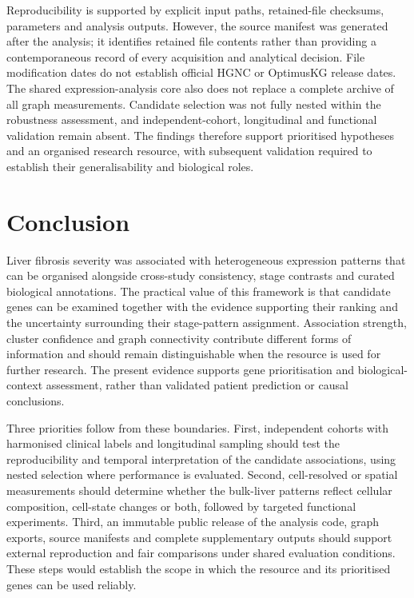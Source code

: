 \documentclass[11pt,a4paper]{article}
\begin{document}
Reproducibility is supported by explicit input paths, retained-file checksums, parameters and analysis outputs. However, the source manifest was generated after the analysis; it identifies retained file contents rather than providing a contemporaneous record of every acquisition and analytical decision. File modification dates do not establish official HGNC or OptimusKG release dates. The shared expression-analysis core also does not replace a complete archive of all graph measurements. Candidate selection was not fully nested within the robustness assessment, and independent-cohort, longitudinal and functional validation remain absent. The findings therefore support prioritised hypotheses and an organised research resource, with subsequent validation required to establish their generalisability and biological roles.

\section*{Conclusion}
Liver fibrosis severity was associated with heterogeneous expression patterns that can be organised alongside cross-study consistency, stage contrasts and curated biological annotations. The practical value of this framework is that candidate genes can be examined together with the evidence supporting their ranking and the uncertainty surrounding their stage-pattern assignment. Association strength, cluster confidence and graph connectivity contribute different forms of information and should remain distinguishable when the resource is used for further research. The present evidence supports gene prioritisation and biological-context assessment, rather than validated patient prediction or causal conclusions.

Three priorities follow from these boundaries. First, independent cohorts with harmonised clinical labels and longitudinal sampling should test the reproducibility and temporal interpretation of the candidate associations, using nested selection where performance is evaluated. Second, cell-resolved or spatial measurements should determine whether the bulk-liver patterns reflect cellular composition, cell-state changes or both, followed by targeted functional experiments. Third, an immutable public release of the analysis code, graph exports, source manifests and complete supplementary outputs should support external reproduction and fair comparisons under shared evaluation conditions. These steps would establish the scope in which the resource and its prioritised genes can be used reliably.
\end{document}
